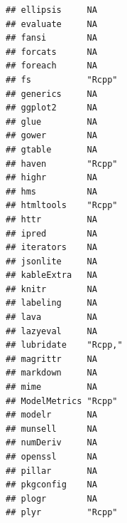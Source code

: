\documentclass[]{article}
\begin{document}
\begin{verbatim}
## ellipsis     NA                                                    
## evaluate     NA                                                    
## fansi        NA                                                    
## forcats      NA                                                    
## foreach      NA                                                    
## fs           "Rcpp"                                                
## generics     NA                                                    
## ggplot2      NA                                                    
## glue         NA                                                    
## gower        NA                                                    
## gtable       NA                                                    
## haven        "Rcpp"                                                
## highr        NA                                                    
## hms          NA                                                    
## htmltools    "Rcpp"                                                
## httr         NA                                                    
## ipred        NA                                                    
## iterators    NA                                                    
## jsonlite     NA                                                    
## kableExtra   NA                                                    
## knitr        NA                                                    
## labeling     NA                                                    
## lava         NA                                                    
## lazyeval     NA                                                    
## lubridate    "Rcpp,"                                               
## magrittr     NA                                                    
## markdown     NA                                                    
## mime         NA                                                    
## ModelMetrics "Rcpp"                                                
## modelr       NA                                                    
## munsell      NA                                                    
## numDeriv     NA                                                    
## openssl      NA                                                    
## pillar       NA                                                    
## pkgconfig    NA                                                    
## plogr        NA                                                    
## plyr         "Rcpp"                                                

\end{verbatim}
\end{document}
